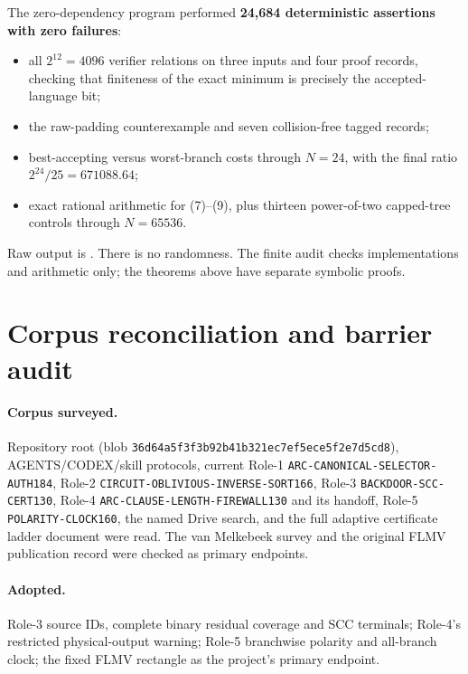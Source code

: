 \documentclass[11pt]{article}
\begin{document}
The zero-dependency program
performed \textbf{24,684 deterministic assertions with zero failures}:
\begin{itemize}
\item all $2^{12}=4096$ verifier relations on three inputs and four proof
      records, checking that finiteness of the exact minimum is precisely the
      accepted-language bit;
\item the raw-padding counterexample and seven collision-free tagged records;
\item best-accepting versus worst-branch costs through $N=24$, with the final
      ratio $2^{24}/25=671088.64$;
\item exact rational arithmetic for (7)--(9), plus thirteen power-of-two
      capped-tree controls through $N=65536$.
\end{itemize}
Raw output is
.
There is no randomness.  The finite audit checks implementations and
arithmetic only; the theorems above have separate symbolic proofs.

\section{Corpus reconciliation and barrier audit}

\paragraph{Corpus surveyed.}
Repository root  (blob
\texttt{36d64a5f3f3b92b41b321ec7ef5ece5f2e7d5cd8}), AGENTS/CODEX/skill
protocols, current Role-1 \texttt{ARC-CANONICAL-SELECTOR-AUTH184}, Role-2
\texttt{CIRCUIT-OBLIVIOUS-INVERSE-SORT166}, Role-3
\texttt{BACKDOOR-SCC-CERT130}, Role-4
\texttt{ARC-CLAUSE-LENGTH-FIREWALL130} and its handoff, Role-5
\texttt{POLARITY-CLOCK160}, the named Drive search, and the full adaptive
certificate ladder document were read.  The van Melkebeek survey and the
original FLMV publication record were checked as primary endpoints.

\paragraph{Adopted.}
Role-3 source IDs, complete binary residual coverage and SCC terminals;
Role-4's restricted physical-output warning; Role-5 branchwise polarity and
all-branch clock; the fixed FLMV rectangle as the project's primary endpoint.
\end{document}
